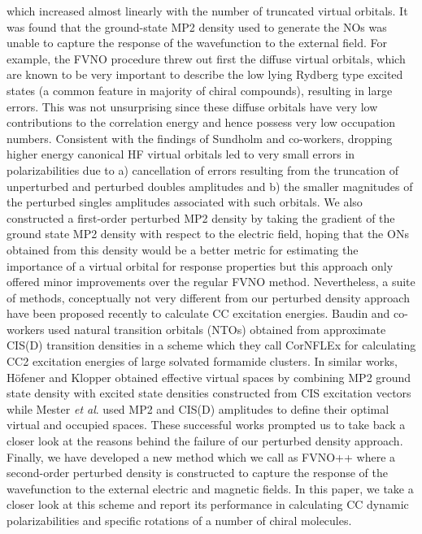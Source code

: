 which increased almost linearly with the number of truncated virtual orbitals. 
It was found that the ground-state MP2 density used to generate the NOs was 
unable to capture the response of the wavefunction to the external field. 
For example, the FVNO procedure threw out first the diffuse virtual 
orbitals, which are known to be very important to describe the low lying Rydberg type 
excited states (a common feature in majority of chiral compounds), 
resulting in large errors. This was not unsurprising since these diffuse 
orbitals have very low contributions to the correlation energy and hence 
possess very low occupation numbers. Consistent with the findings of Sundholm 
and co-workers\cite{Sundholm11}, dropping higher energy canonical HF 
virtual orbitals led to very small errors in polarizabilities due
to a) cancellation of errors resulting from the truncation of unperturbed 
and perturbed doubles amplitudes and b) the smaller magnitudes of the perturbed
singles amplitudes associated with such orbitals. 
We also constructed a first-order perturbed MP2 density by taking the gradient of the
ground state MP2 density with respect to the electric field, 
hoping that the ONs obtained from this density would be a better metric for 
estimating the importance of a virtual orbital 
for response properties but this approach only offered
minor improvements over the regular FVNO method. Nevertheless,
a suite of methods, conceptually not very different from our 
perturbed density approach have been proposed recently 
to calculate CC excitation energies. Baudin and co-workers 
used natural transition orbitals (NTOs) obtained from approximate 
CIS(D) transition densities in a scheme which they call CorNFLEx for 
calculating CC2 excitation energies of large solvated formamide 
clusters\cite{Baudin17}. In similar works, H{\"o}fener and Klopper 
obtained effective virtual spaces by combining MP2 
ground state density with excited state densities constructed from CIS 
excitation vectors\cite{HofenerKlopper17} while Mester {\em et al}. used MP2 and CIS(D) amplitudes 
to define their optimal virtual and occupied spaces\cite{Mester17,Mester18}.
These successful works prompted us to take back a closer look at the 
reasons behind the failure of our perturbed density approach. 
Finally, we have developed a new method which we call as FVNO++ 
where a second-order perturbed density is constructed to 
capture the response of the wavefunction to the external electric 
and magnetic fields. In this paper, we take a closer look at this 
scheme and report its performance in calculating CC dynamic 
polarizabilities and specific rotations of a number of chiral molecules.
